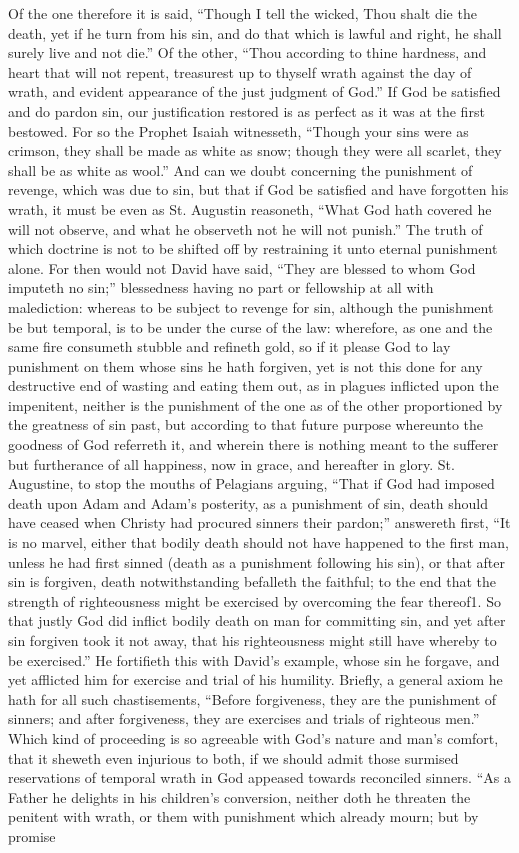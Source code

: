 Of the one therefore it is said, “Though I tell the wicked, Thou shalt die the death, yet if he turn from his sin, and do that which is lawful and right, he shall surely live and not die.” Of the other, “Thou according to thine hardness, and heart that will not repent, treasurest up to thyself wrath against the day of wrath, and evident appearance of the just judgment of God.” If God be satisfied and do pardon sin, our justification restored is as perfect as it was at the first bestowed. For so the Prophet Isaiah witnesseth, “Though your sins were as crimson, they shall be made as white as snow; though they were all scarlet, they shall be as white as wool.” And can we doubt concerning the punishment of revenge, which was due to sin, but that if God be satisfied and have forgotten his wrath, it must be even as St. Augustin reasoneth, “What God hath covered he will not observe, and what he observeth not he will not punish.” The truth of which doctrine is not to be shifted off by restraining it unto eternal punishment alone. For then would not David have said, “They are blessed to whom God imputeth no sin;” blessedness having no part or fellowship at all with malediction: whereas to be subject to revenge for sin, although the punishment be but temporal, is to be under the curse of the law: wherefore, as one and the same fire consumeth  stubble and refineth gold, so if it please God to lay punishment on them whose sins he hath forgiven, yet is not this done for any destructive end of wasting and eating them out, as in plagues inflicted upon the impenitent, neither is the punishment of the one as of the other proportioned by the greatness of sin past, but according to that future purpose whereunto the goodness of God referreth it, and wherein there is nothing meant to the sufferer but furtherance of all happiness, now in grace, and hereafter in glory. St. Augustine, to stop the mouths of Pelagians arguing, “That if God had imposed death upon Adam and Adam’s posterity, as a punishment of sin, death should have ceased when Christy had procured sinners their pardon;” answereth first, “It is no marvel, either that bodily death should not have happened to the first man, unless he had first sinned (death as a punishment following his sin), or that after sin is forgiven, death notwithstanding befalleth the faithful; to the end that the strength of righteousness might be exercised by overcoming the fear thereof1. So that justly God did inflict bodily death on man for committing sin, and yet after sin forgiven took it not away, that his righteousness might still have whereby to be exercised.” He fortifieth this with David’s example, whose sin he forgave, and yet afflicted him for exercise and trial of his humility. Briefly, a general axiom he hath for all such chastisements, “Before forgiveness, they are the punishment of sinners; and after forgiveness, they are exercises and trials of righteous men.” Which kind of proceeding is so agreeable with God’s nature and man’s comfort, that it sheweth even injurious to both, if we should admit those surmised reservations of temporal wrath in God appeased towards  reconciled sinners. “As a Father he delights in his children’s conversion, neither doth he threaten the penitent with wrath, or them with punishment which already mourn; but by promise 